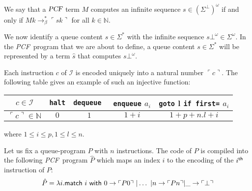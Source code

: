 \documentclass{article}
\newcommand{\encode}[1]{\ulcorner #1 \urcorner}
\newcommand{\nat}{\mathbb{N}}
\newcommand{\betared}{\rightarrow_\beta}
\newcommand\pcf{\textsl{PCF}}
\begin{document}
We say that a $\pcf$ term $M$ computes an infinite sequence $s \in {(\Sigma^\bot)}^\omega$ if and only if 
$M k \betared^* \encode{s k}$ for all $k\in \nat$.

We now identify a queue content $s \in \Sigma^*$ with the infinite sequence $s \bot^\omega \in \Sigma^\omega$. In the \pcf\ program that we are about to define, a queue content $s \in \Sigma^*$ will be represented by a term $\hat{s}$ that computes $s \bot^\omega$.

Each instruction $c$ of $\mathcal{I}$ is encoded uniquely into a natural number $\encode{ c }$. The following table gives an example of such an injective function:
\begin{center}
\begin{tabular}{c|c|c|c|c}
$c \in \mathcal{I}$ & {\tt halt} & {\tt dequeue } & {\tt enqueue} $a_i$ &  {\tt goto} l {\tt if first=} $a_i$ \\ \hline
$\encode{ c } \in \nat$ & $0$ & $1$ & $1+i$ & $1+p + n.l +i$ \\
\end{tabular} 
\end{center}
where $1 \leq i \leq p, 1 \leq l \leq n$.

Let us fix a queue-program $P$ with $n$ instructions. 
The code of $P$ is compiled into the following \pcf\ program $\hat{P}$
which maps an index $i$ to the encoding of the $i^{\sf th}$ instruction of $P$:
\begin{equation}
\hat{P} = \lambda i .  {\sf match\ } i {\sf \ with\ } 
   0 \rightarrow \encode{ P 0 } 
  \ | \ldots \ | n \rightarrow \encode{ P n }  | \_ \rightarrow \encode{\bot}
\end{equation} 
\end{document}
